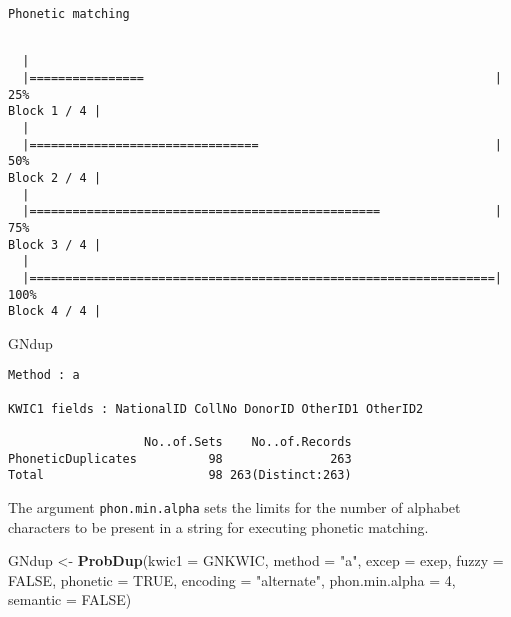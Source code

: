 \documentclass[]{article}
\newenvironment{Shaded}{\begin{snugshade}}{\end{snugshade}}
\newcommand{\DataTypeTok}[1]{\textcolor[rgb]{0.13,0.29,0.53}{#1}}
\newcommand{\DecValTok}[1]{\textcolor[rgb]{0.00,0.00,0.81}{#1}}
\newcommand{\KeywordTok}[1]{\textcolor[rgb]{0.13,0.29,0.53}{\textbf{#1}}}
\newcommand{\NormalTok}[1]{#1}
\newcommand{\OtherTok}[1]{\textcolor[rgb]{0.56,0.35,0.01}{#1}}
\newcommand{\StringTok}[1]{\textcolor[rgb]{0.31,0.60,0.02}{#1}}
\begin{document}
\begin{verbatim}
Phonetic matching
\end{verbatim}

\begin{verbatim}

  |                                                                       
  |================                                                 |  25%
Block 1 / 4 |
  |                                                                       
  |================================                                 |  50%
Block 2 / 4 |
  |                                                                       
  |=================================================                |  75%
Block 3 / 4 |
  |                                                                       
  |=================================================================| 100%
Block 4 / 4 |
\end{verbatim}

\begin{Shaded}
\begin{Highlighting}[]
\NormalTok{GNdup}
\end{Highlighting}
\end{Shaded}

\begin{verbatim}
Method : a

KWIC1 fields : NationalID CollNo DonorID OtherID1 OtherID2
 
                   No..of.Sets    No..of.Records
PhoneticDuplicates          98               263
Total                       98 263(Distinct:263)
\end{verbatim}

The argument \texttt{phon.min.alpha} sets the limits for the number of
alphabet characters to be present in a string for executing phonetic
matching.

\begin{Shaded}
\begin{Highlighting}[]
\NormalTok{GNdup <-}\StringTok{ }\KeywordTok{ProbDup}\NormalTok{(}\DataTypeTok{kwic1 =}\NormalTok{ GNKWIC, }\DataTypeTok{method =} \StringTok{"a"}\NormalTok{, }\DataTypeTok{excep =}\NormalTok{ exep, }
                 \DataTypeTok{fuzzy =} \OtherTok{FALSE}\NormalTok{,}
                 \DataTypeTok{phonetic =} \OtherTok{TRUE}\NormalTok{, }\DataTypeTok{encoding =} \StringTok{"alternate"}\NormalTok{, }\DataTypeTok{phon.min.alpha =} \DecValTok{4}\NormalTok{,}
                 \DataTypeTok{semantic =} \OtherTok{FALSE}\NormalTok{)}
\end{Highlighting}
\end{Shaded}
\end{document}
